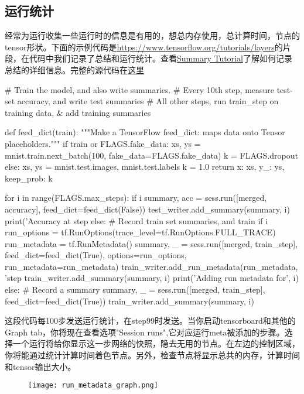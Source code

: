 \subsection{运行统计}
经常为运行收集一些运行时的信息是有用的，想总内存使用，总计算时间，节点的tensor形状。下面的示例代码是\href{simple MINST tutorial}{https://www.tensorflow.org/tutorials/layers}的片段，在代码中我们记录了总结和运行统计。查看\href{https://www.tensorflow.org/programmers_guide/summaries_and_tensorboard#serializing-the-data}{Summary Tutorial}了解如何记录总结的详细信息。完整的源代码在\href{https://www.github.com/tensorflow/tensorflow/blob/r1.6/tensorflow/examples/tutorials/mnist/mnist_with_summaries.py}{这里}
\begin{pythoncode}
# Train the model, and also write summaries.
  # Every 10th step, measure test-set accuracy, and write test summaries
  # All other steps, run train_step on training data, & add training summaries

  def feed_dict(train):
    """Make a TensorFlow feed_dict: maps data onto Tensor placeholders."""
    if train or FLAGS.fake_data:
      xs, ys = mnist.train.next_batch(100, fake_data=FLAGS.fake_data)
      k = FLAGS.dropout
    else:
      xs, ys = mnist.test.images, mnist.test.labels
      k = 1.0
    return {x: xs, y_: ys, keep_prob: k}

  for i in range(FLAGS.max_steps):
    if i %
      summary, acc = sess.run([merged, accuracy], feed_dict=feed_dict(False))
      test_writer.add_summary(summary, i)
      print('Accuracy at step %
    else:  # Record train set summaries, and train
      if i %
        run_options = tf.RunOptions(trace_level=tf.RunOptions.FULL_TRACE)
        run_metadata = tf.RunMetadata()
        summary, _ = sess.run([merged, train_step],
                              feed_dict=feed_dict(True),
                              options=run_options,
                              run_metadata=run_metadata)
        train_writer.add_run_metadata(run_metadata, 'step%
        train_writer.add_summary(summary, i)
        print('Adding run metadata for', i)
      else:  # Record a summary
        summary, _ = sess.run([merged, train_step], feed_dict=feed_dict(True))
        train_writer.add_summary(summary, i)
\end{pythoncode}
这段代码每100步发送运行统计，在step99时发送。当你启动tensorboard和其他的Graph tab，你将现在查看选项"Session runs",它对应运行meta被添加的步骤。选择一个运行将给你显示这一步网络的快照，隐去无用的节点。在左边的控制区域，你将能通过统计计算时间着色节点。另外，检查节点将显示总共的内存，计算时间和tensor输出大小。
\begin{figure}[H]
\centering
\texttt{[image: run\_metadata\_graph.png]}
\end{figure}


